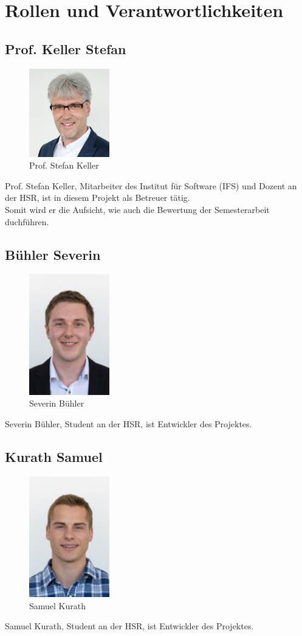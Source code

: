 \section{Rollen und Verantwortlichkeiten}
\subsection{Prof. Keller Stefan}
\begin{figure}[H]
	\centering
	\includegraphics[width=35mm]{images/Skeller.png}
	\caption{Prof. Stefan Keller}
\end{figure}

Prof. Stefan Keller, Mitarbeiter des Institut für Software (IFS) und Dozent an
der HSR, ist in diesem Projekt als Betreuer tätig. \\

Somit wird er die Aufsicht, wie auch die Bewertung der Semesterarbeit duchführen.

\subsection{Bühler Severin}
\begin{figure}[H]
	\centering
	\includegraphics[width=35mm]{images/sbuehler.jpg}
	\caption{Severin Bühler}
\end{figure}
Severin Bühler, Student an der HSR, ist Entwickler des Projektes.
\newpage
\subsection{Kurath Samuel}
\begin{figure}[H]
	\centering
	\includegraphics[width=35mm]{images/skurath.jpg}
	\caption{Samuel Kurath}
\end{figure}
Samuel Kurath, Student an der HSR, ist Entwickler des Projektes.
